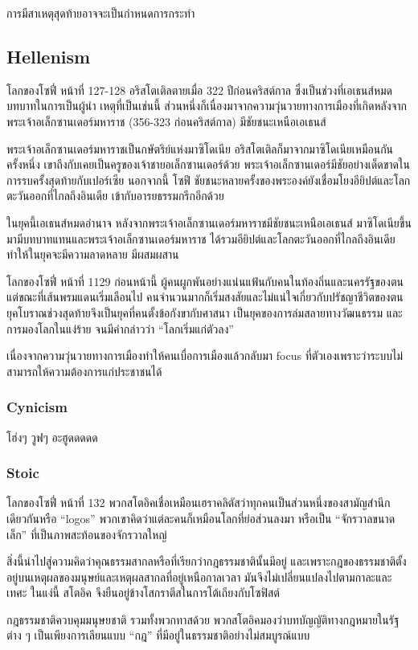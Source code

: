 การมีสาเหตุสุดท้ายอาจจะเป็นกำหนดการกระทำ

\subsection{Hellenism}

\begin{bookquote}{โลกของโซฟี่ หน้าที่ 127-128}
อริสโตเติลตายเมื่อ 322 ปีก่อนคริสต์กาล ซึ่งเป็นช่วงที่เอเธนส์หมดบทบาทในการเป็นผู้นำ เหตุที่เป็นเช่นนี้ ส่วนหนึ่งก็เนื่องมาจากความวุ่นวายทางการเมืองที่เกิดหลังจากพระเจ้าอเล็กซานเดอร์มหาราช (356-323 ก่อนคริสต์กาล) มีชัยชนะเหนือเอเธนส์

พระเจ้าอเล็กซานเดอร์มหาราชเป็นกษัตริย์แห่งมาซิโดเนีย อริสโตเติลก็มาจากมาซิโดเนียเหมือนกัน ครั้งหนึ่ง เขาถึงกับเคยเป็นครูของเจ้าชายอเล็กซานเดอร์ด้วย พระเจ้าอเล็กซานเดอร์มีชัยอย่างเด็ดขาดในการรบครั้งสุดท้ายกับเปอร์เซีย นอกจากนี้ โซฟี ชัยชนะหลายครั้งของพระองค์ยังเชื่อมโยงอียิปต์และโลกตะวันออกที่ไกลถึงอินเดีย เข้ากับอารยธรรมกรีกอีกด้วย
\end{bookquote}

ในยุคนี้เอเธนส์หมดอำนาจ หลังจากพระเจ้าอเล็กซานเดอร์มหาราชมีชัยชนะเหนือเอเธนส์ มาซิโดเนียขึ้นมามีบทบาทแทนและพระเจ้าอเล็กซานเดอร์มหาราช ได้รวมอียิปต์และโลกตะวันออกที่ไกลถึงอินเดีย
ทำให้ในยุคจะมีความลาดหลาย มีผสมผสาน

\begin{bookquote}{โลกของโซฟี่ หน้าที่ 1129}
ก่อนหน้านี้ ผู้คนผูกพันอย่างแน่นแฟ้นกับคนในท้องถิ่นและนครรัฐของตน แต่ขณะที่เส้นพรมแดนเริ่มเลือนไป คนจำนวนมากก็เริ่มสงสัยและไม่แน่ใจเกี่ยวกับปรัชญาชีวิตของตน ยุคโบราณช่วงสุดท้ายจึงเป็นยุคที่คนตั้งข้อกังขากับศาสนา เป็นยุคของการล่มสลายทางวัฒนธรรม และการมองโลกในแง่ร้าย จนมีคำกล่าวว่า “โลกเริ่มแก่ตัวลง”
\end{bookquote}

เนื่องจากความวุ่นวายทางการเมืองทำให้คนเบื่อการเมืองแล้วกลับมา focus ที่ตัวเองเพราะว่าระบบไม่สามารถให้ความต้องการแก่ประชาชนได้

\subsubsection{Cynicism}
โฮ่งๆ วูฟๆ อะฮูดดดดด

\subsubsection{Stoic}

\begin{bookquote}{โลกของโซฟี่ หน้าที่ 132}
พวกสโตอิคเชื่อเหมือนเฮราคลิตัสว่าทุกคนเป็นส่วนหนึ่งของสามัญสำนึกเดียวกันหรือ “logos” พวกเขาคิดว่าแต่ละคนก็เหมือนโลกที่ย่อส่วนลงมา หรือเป็น “จักรวาลขนาดเล็ก” ที่เป็นภาพสะท้อนของจักรวาลใหญ่

สิ่งนี้นำไปสู่ความคิดว่าคุณธรรมสากลหรือที่เรียกว่ากฎธรรมชาตินั้นมีอยู่ และเพราะกฎของธรรมชาติตั้งอยู่บนเหตุผลของมนุษย์และเหตุผลสากลที่อยู่เหนือกาลเวลา มันจึงไม่เปลี่ยนแปลงไปตามกาละและเทศะ ในแง่นี้ สโตอิค จึงยืนอยู่ข้างโสกราตีสในการโต้เถียงกับโซฟิสต์

กฎธรรมชาติควบคุมมนุษยชาติ รวมทั้งพวกทาสด้วย พวกสโตอิคมองว่าบทบัญญัติทางกฎหมายในรัฐต่าง ๆ เป็นเพียงการเลียนแบบ “กฎ” ที่มีอยู่ในธรรมชาติอย่างไม่สมบูรณ์แบบ
\end{bookquote}

